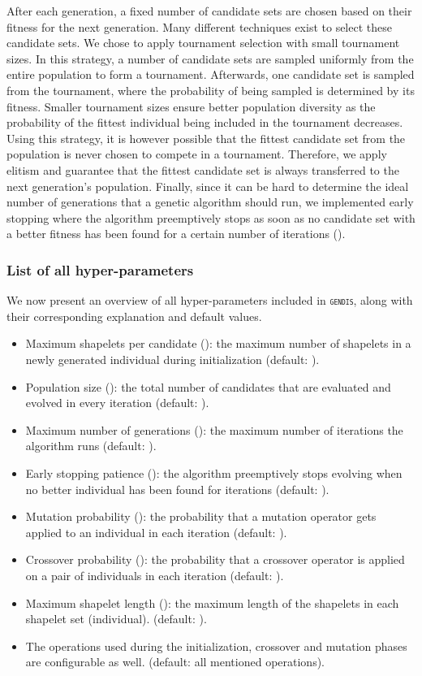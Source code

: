 \documentclass[runningheads]{llncs}
\begin{document}
After each generation, a fixed number of candidate sets are chosen based on their fitness for the next generation. Many different techniques exist to select these candidate sets. We chose to apply tournament selection with small tournament sizes. In this strategy, a number of candidate sets are sampled uniformly from the entire population to form a tournament. Afterwards, one candidate set is sampled from the tournament, where the probability of being sampled is determined by its fitness. Smaller tournament sizes ensure better population diversity as the probability of the fittest individual being included in the tournament decreases. Using this strategy, it is however possible that the fittest candidate set from the population is never chosen to compete in a tournament. Therefore, we apply elitism and guarantee that the fittest candidate set is always transferred to the next generation's population. Finally, since it can be hard to determine the ideal number of generations that a genetic algorithm should run, we implemented early stopping where the algorithm preemptively stops as soon as no candidate set with a better fitness has been found for a certain number of iterations ().



\subsubsection{List of all hyper-parameters}

We now present an overview of all hyper-parameters included in \textsc{\texttt{gendis}}, along with their corresponding explanation and default values.

\begin{itemize}
	\item Maximum shapelets per candidate (): the maximum number of shapelets in a newly generated individual during initialization (default: ).
	\item Population size (): the total number of candidates that are evaluated and evolved in every iteration (default: ).
	\item Maximum number of generations (): the maximum number of iterations the algorithm runs (default: ).
	\item Early stopping patience (): the algorithm preemptively stops evolving when no better individual has been found for  iterations (default: ).
	\item Mutation probability (): the probability that a mutation operator gets applied to an individual in each iteration (default: ).
	\item Crossover probability (): the probability that a crossover operator is applied on a pair of individuals in each iteration (default: ).
	\item Maximum shapelet length (): the maximum length of the shapelets in each shapelet set (individual). (default: ).
	\item The operations used during the initialization, crossover and mutation phases are configurable as well. (default: all mentioned operations).
\end{itemize}
\end{document}
